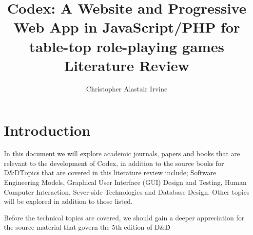 \documentclass[proposal]{cmpreport}
\title{Codex: A Website and Progressive Web App in JavaScript/PHP for table-top role-playing games \\ Literature Review}
\author{Christopher Alastair Irvine}
\newcommand{\dnd}{D\&D}
\begin{document}
	\section{Introduction}
	In this document we will explore academic journals, papers and books that are relevant to the development of Codex, in addition to the source books for \dnd \. Topics that are covered in this literature review include; Software Engineering Models, Graphical User Interface (GUI) Design and Testing, Human Computer Interaction, Sever-side Technologies and Database Design. Other topics will be explored in addition to those listed. 
	
	Before the technical topics are covered, we should gain a deeper appreciation for the source material that govern the 5th edition of \dnd \.

\end{document}
